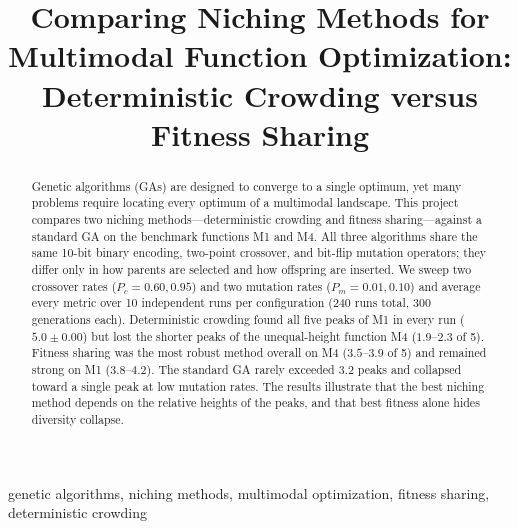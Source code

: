 \documentclass[conference]{IEEEtran}
\begin{document}
\title{Comparing Niching Methods for Multimodal Function Optimization:\\
Deterministic Crowding versus Fitness Sharing}

\author{
\and
{}
}

\maketitle

\begin{abstract}
Genetic algorithms (GAs) are designed to converge to a single optimum, yet many
problems require locating every optimum of a multimodal landscape. This project
compares two niching methods---deterministic crowding and fitness
sharing---against a standard GA on the benchmark functions M1 and M4. All three
algorithms share the same 10-bit binary encoding, two-point crossover, and
bit-flip mutation operators; they differ only in how parents are selected and
how offspring are inserted. We sweep two crossover rates ($P_c = 0.60, 0.95$)
and two mutation rates ($P_m = 0.01, 0.10$) and average every metric over 10
independent runs per configuration (240 runs total, 300 generations each).
Deterministic crowding found all five peaks of M1 in every run
($5.0 \pm 0.00$) but lost the shorter peaks of the unequal-height function M4
($1.9$--$2.3$ of 5). Fitness sharing was the most robust method overall on M4
($3.5$--$3.9$ of 5) and remained strong on M1 ($3.8$--$4.2$). The standard GA
rarely exceeded $3.2$ peaks and collapsed toward a single peak at low mutation
rates. The results illustrate that the best niching method depends on the
relative heights of the peaks, and that best fitness alone hides diversity
collapse.
\end{abstract}

\begin{IEEEkeywords}
genetic algorithms, niching methods, multimodal optimization, fitness sharing,
deterministic crowding
\end{IEEEkeywords}
\end{document}
